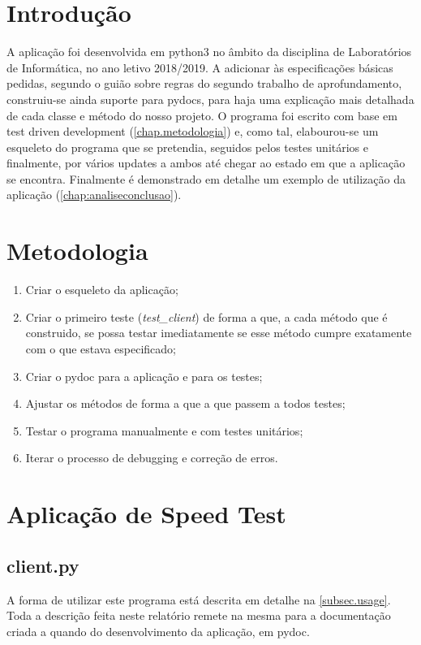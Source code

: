 \documentclass{report}
\begin{document}
\chapter{Introdução}
\label{chap.introducao}

A aplicação foi desenvolvida em python3 no âmbito da disciplina de Laboratórios de Informática, no ano letivo 2018/2019. A adicionar às especificações básicas pedidas, segundo o guião sobre regras do segundo trabalho de aprofundamento, construiu-se ainda suporte para pydocs, para haja uma explicação mais detalhada de cada classe e método do nosso projeto. O programa foi escrito com base em test driven development  (\autoref{chap.metodologia}) e, como tal, elabourou-se um esqueleto do programa que se pretendia, seguidos pelos testes unitários e finalmente, por vários updates a ambos até chegar ao estado em que a aplicação se encontra. Finalmente é demonstrado em detalhe um exemplo de utilização da aplicação (\autoref{chap:analiseconclusao}).


\chapter{Metodologia}
\label{chap.metodologia}

\begin{enumerate}
	\item Criar o esqueleto da aplicação;
	\item Criar o primeiro teste (\textit{test\_client}) de forma a que, a cada método que é construido, se possa testar imediatamente se esse método cumpre exatamente com o que estava especificado;
	\item Criar o pydoc para a aplicação e para os testes;
	\item Ajustar os métodos de forma a que a que passem a todos testes;
	\item Testar o programa manualmente e com testes unitários;
	\item Iterar o processo de debugging e correção de erros.
\end{enumerate}


\chapter{Aplicação de Speed Test}
\label{chap.Aplicação de Speed Test}
\section{client.py}
\label{sec.client}
A forma de utilizar este programa está descrita em detalhe na \autoref{subsec.usage}. Toda a descrição feita neste relatório remete na mesma para a documentação criada a quando do desenvolvimento da aplicação, em pydoc.
\end{document}
